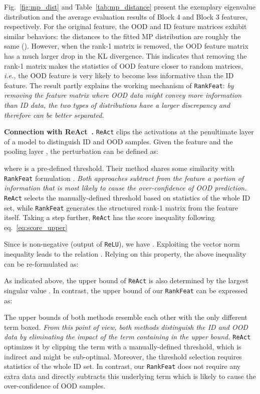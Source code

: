 Fig.~\ref{fig:mp_dist} and Table~\ref{tab:mp_distance} present the exemplary eigenvalue distribution and the average evaluation results of Block 4 and Block 3 features, respectively. For the original feature, the OOD and ID feature matrices exhibit similar behaviors: the distances to the fitted MP distribution are roughly the same (). However, when the rank-1 matrix is removed, the OOD feature matrix has a much larger drop in the KL divergence. This indicates that removing the rank-1 matrix makes the statistics of OOD feature closer to random matrices, \emph{i.e.,} the OOD feature is very likely to become less informative than the ID feature. The result partly explains the working mechanism of \texttt{RankFeat}: \textit{by removing the feature matrix where OOD data might convey more information than ID data, the two types of distributions have a larger discrepancy and therefore can be better separated.} 





\noindent \textbf{Connection with ReAct~\cite{sun2021react}.} \texttt{ReAct} clips the activations at the penultimate layer of a model to distinguish ID and OOD samples. Given the feature  and the pooling layer , the perturbation can be defined as:

where  is a pre-defined threshold. Their method shares some similarity with \texttt{RankFeat} formulation . \textit{Both approaches subtract from the feature a portion of information that is most likely to cause the over-confidence of OOD prediction.} \texttt{ReAct} selects the manually-defined threshold  based on statistics of the whole ID set, while \texttt{RankFeat} generates the structured rank-1 matrix from the feature itself. Taking a step further, \texttt{ReAct} has the score inequality following eq.~\eqref{eq:score_upper}

Since  is non-negative (output of \texttt{ReLU}),
we have . Exploiting the vector norm inequality  leads to the relation . Relying on this property, the above inequality can be re-formulated as:

As indicated above, the upper bound of \texttt{ReAct} is also determined by the largest singular value . In contrast, the upper bound of our \texttt{RankFeat} can be expressed as:

The upper bounds of both methods resemble each other with the only different term boxed. \textit{From this point of view, both methods distinguish the ID and OOD data by eliminating the impact of the term containing  in the upper bound.} \texttt{ReAct} optimizes it by clipping the term with a manually-defined threshold, which is indirect and might be sub-optimal. Moreover, the threshold selection requires statistics of the whole ID set. In contrast, our \texttt{RankFeat} does not require any extra data and directly subtracts this underlying term which is likely to cause the over-confidence of OOD samples. 



